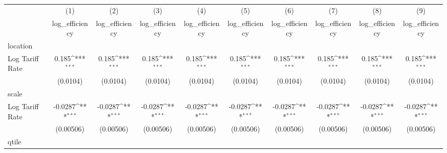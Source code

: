 {
\def\sym#1{\ifmmode^{#1}\else\(^{#1}\)\fi}
\begin{tabular}{l*{9}{c}}
\hline\hline
                    &\multicolumn{1}{c}{(1)}&\multicolumn{1}{c}{(2)}&\multicolumn{1}{c}{(3)}&\multicolumn{1}{c}{(4)}&\multicolumn{1}{c}{(5)}&\multicolumn{1}{c}{(6)}&\multicolumn{1}{c}{(7)}&\multicolumn{1}{c}{(8)}&\multicolumn{1}{c}{(9)}\\
                    &\multicolumn{1}{c}{log\_efficiency}&\multicolumn{1}{c}{log\_efficiency}&\multicolumn{1}{c}{log\_efficiency}&\multicolumn{1}{c}{log\_efficiency}&\multicolumn{1}{c}{log\_efficiency}&\multicolumn{1}{c}{log\_efficiency}&\multicolumn{1}{c}{log\_efficiency}&\multicolumn{1}{c}{log\_efficiency}&\multicolumn{1}{c}{log\_efficiency}\\
\hline
location            &                     &                     &                     &                     &                     &                     &                     &                     &                     \\
Log Tariff Rate     &       0.185\sym{***}&       0.185\sym{***}&       0.185\sym{***}&       0.185\sym{***}&       0.185\sym{***}&       0.185\sym{***}&       0.185\sym{***}&       0.185\sym{***}&       0.185\sym{***}\\
                    &    (0.0104)         &    (0.0104)         &    (0.0104)         &    (0.0104)         &    (0.0104)         &    (0.0104)         &    (0.0104)         &    (0.0104)         &    (0.0104)         \\
\hline
scale               &                     &                     &                     &                     &                     &                     &                     &                     &                     \\
Log Tariff Rate     &     -0.0287\sym{***}&     -0.0287\sym{***}&     -0.0287\sym{***}&     -0.0287\sym{***}&     -0.0287\sym{***}&     -0.0287\sym{***}&     -0.0287\sym{***}&     -0.0287\sym{***}&     -0.0287\sym{***}\\
                    &   (0.00506)         &   (0.00506)         &   (0.00506)         &   (0.00506)         &   (0.00506)         &   (0.00506)         &   (0.00506)         &   (0.00506)         &   (0.00506)         \\
\hline
qtile               &                     &                     &                     &                     &                     &                     &                     &                     &                     \\

\end{tabular}}
